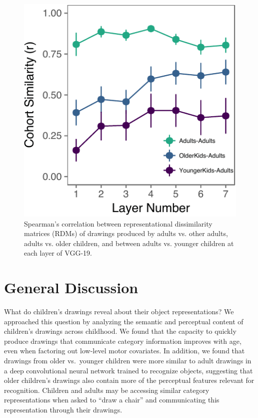 \documentclass[10pt, letterpaper]{article}
\newenvironment{CodeChunk}{}{}
\begin{document}
\begin{CodeChunk}
\begin{figure}

{\centering \includegraphics{figs/layerWise-1} 

}

\caption[Spearman's correlation between representational dissimilarity matrices (RDMs) of drawings produced by adults vs]{Spearman's correlation between representational dissimilarity matrices (RDMs) of drawings produced by adults vs. other adults, adults vs. older children, and between adults vs. younger children at each layer of VGG-19. }\label{fig:layerWise}
\end{figure}
\end{CodeChunk}


\section{General Discussion}\label{general-discussion}

What do children's drawings reveal about their object representations?
We approached this question by analyzing the semantic and perceptual
content of children's drawings across childhood. We found that the
capacity to quickly produce drawings that communicate category
information improves with age, even when factoring out low-level motor
covariates. In addition, we found that drawings from older vs.~younger
children were more similar to adult drawings in a deep convolutional
neural network trained to recognize objects, suggesting that older
children's drawings also contain more of the perceptual features
relevant for recognition. Children and adults may be accessing similar
category representations when asked to ``draw a chair'' and
communicating this representation through their drawings.
\end{document}
